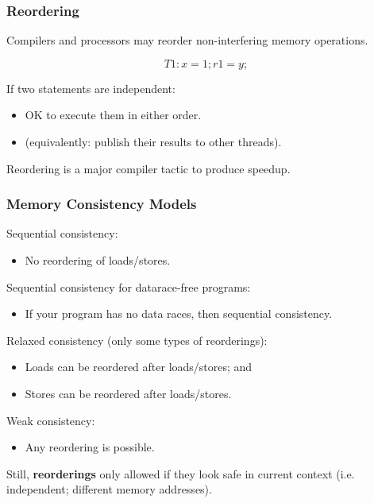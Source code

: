 \documentclass[aspectratio=43]{beamer}
\newenvironment{changemargin}[1]{%
  \begin{list}{}{%
    \setlength{\topsep}{0pt}%
    \setlength{\leftmargin}{#1}%
    \setlength{\rightmargin}{1em}
    \setlength{\listparindent}{\parindent}%
    \setlength{\itemindent}{\parindent}%
    \setlength{\parsep}{\parskip}%
  }%
  \item[]}{\end{list}}
\begin{document}
\begin{frame}
  \frametitle{Reordering}

  \begin{changemargin}{1.5cm}
     Compilers and processors may reorder non-interfering memory
     operations.

      \[ T1: x = 1; r1 = y; \]

     If two statements are independent:
     \begin{itemize}
        \item OK to execute them in either order.
        \item (equivalently: publish their results to other threads).
     \end{itemize}

     Reordering is a major compiler tactic to produce speedup.
  \end{changemargin}
\end{frame}


\begin{frame}
  \frametitle{Memory Consistency Models}

  \begin{changemargin}{1.5cm}
    Sequential consistency:
      \begin{itemize}
        \item No reordering of loads/stores.
      \end{itemize}
    Sequential consistency for datarace-free programs:
      \begin{itemize}
        \item If your program
  has no data races, then sequential consistency.
      \end{itemize}
    Relaxed consistency (only some types of reorderings):
      \begin{itemize}
        \item Loads can be reordered after loads/stores; and
        \item Stores can be reordered after loads/stores.
      \end{itemize}
    Weak consistency:
      \begin{itemize}
        \item Any reordering is possible.
      \end{itemize}

  Still, {\bf reorderings} only allowed if they look safe in current context
  (i.e. independent; different memory addresses).
  \end{changemargin}
\end{frame}
\end{document}

